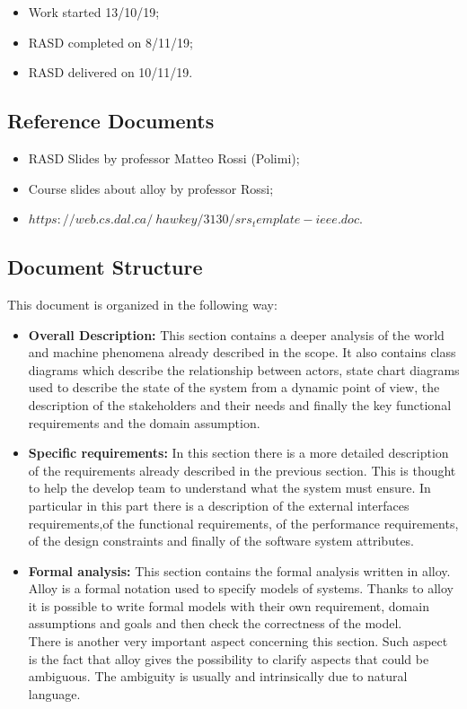 \documentclass[titlepage]{article}
\begin{document}
\begin{itemize}

	\item Work started 13/10/19;
	\item RASD completed on 8/11/19;
	\item RASD delivered on 10/11/19.

\end{itemize}

\subsection{Reference Documents}
\begin{itemize}
	\item RASD Slides by professor Matteo Rossi (Polimi);
	\item Course slides about alloy by professor Rossi;
	\item $https://web.cs.dal.ca/~hawkey/3130/srs_template-ieee.doc.$
	
\end{itemize}
\subsection{Document Structure}
This document is organized in the following way:
\begin{itemize}
	\item \textbf{Overall Description:} This section contains a deeper analysis of the world and machine phenomena already described in the scope. It also contains class diagrams which describe the relationship between actors, state chart diagrams used to describe the state of the system from a dynamic point of view, the description of the stakeholders and their needs and finally the key functional requirements and the domain assumption.
	
	\item \textbf{Specific requirements:} In this section there is a more detailed description of the requirements already described in the previous section. This is thought to help the develop team to understand what the system must ensure. In particular in this part there is a description of the external interfaces requirements,of the functional requirements, of the performance requirements, of the design constraints and finally of the software system attributes.
	
	\item \textbf{Formal analysis:} This section contains the formal analysis written in alloy. Alloy is a formal notation used to specify models of systems. Thanks to alloy it is possible to write formal models with their own requirement, domain assumptions and goals and then check the correctness of the model.\\
There is another very important aspect concerning this section. Such aspect is the fact that alloy gives the possibility to clarify aspects that could be ambiguous. The ambiguity is usually and intrinsically due to natural language. 
\end{itemize}
\newpage
\end{document}
